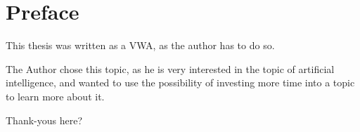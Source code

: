 \chapter{Preface}
This thesis was written as a VWA, as the author has to do so.

The Author chose this topic, as he is very interested in the topic of artificial intelligence, and wanted to use the possibility of investing more time into a topic to learn more about it.

Thank-yous here?